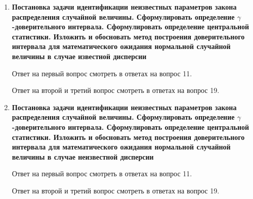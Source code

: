 \documentclass[12pt]{report}
\begin{document}
\begin{enumerate}
	\clearpage
	
	\item \textbf{Постановка задачи идентификации неизвестных параметров закона распределения случайной величины. Сформулировать определение $\gamma$-доверительного интервала. Сформулировать
		определение центральной статистики. Изложить и обосновать метод построения доверительного интервала для математического ожидания нормальной случайной величины в случае
		известной дисперсии}
	
	Ответ на первый вопрос смотреть в ответах на вопрос 11.
	
	Ответ на второй и третий вопрос смотреть в ответах на вопрос 19.
	
	\begin{figure}[!h]
	\end{figure}
	
	\clearpage
	
	\item \textbf{Постановка задачи идентификации неизвестных параметров закона распределения случайной величины. Сформулировать определение $\gamma$-доверительного интервала. Сформулировать
		определение центральной статистики. Изложить и обосновать метод построения доверительного интервала для математического ожидания нормальной случайной величины в случае
		неизвестной дисперсии}
	
	Ответ на первый вопрос смотреть в ответах на вопрос 11.
	
	Ответ на второй и третий вопрос смотреть в ответах на вопрос 19.
	

\end{enumerate}
\end{document}
